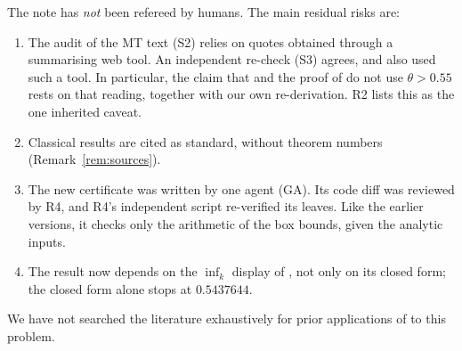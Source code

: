 \documentclass[11pt]{amsart}
\theoremstyle{definition}
\theoremstyle{remark}
\begin{document}
\smallskip
The note has \emph{not} been refereed by humans. The main residual risks are:
\begin{enumerate}[label=(\roman*),leftmargin=*]
\item The audit of the MT text (S2) relies on quotes obtained through a summarising web tool. An independent re-check (S3) agrees, and also used such a tool. In particular,
the claim that \cite[Lemma~4.2]{MT} and the proof of \cite[Lemma~4.3]{MT} do not use $\theta>0.55$ rests on that reading, together with our own
re-derivation. R2 lists this as the one inherited caveat.
\item Classical results are cited as standard, without theorem numbers (Remark~\ref{rem:sources}).
\item The new certificate was written by one agent (GA). Its code diff was reviewed by R4, and R4's independent script re-verified its leaves.
Like the earlier versions, it checks only the arithmetic of the box bounds, given the analytic inputs.
\item The result now depends on the $\inf_k$ display of \cite[Proposition~12.1]{GM}, not only on its closed form; the closed form alone stops at
$0.5437644$.
\end{enumerate}
We have not searched the literature exhaustively for prior applications of \cite{GM} to this problem.
\end{document}
